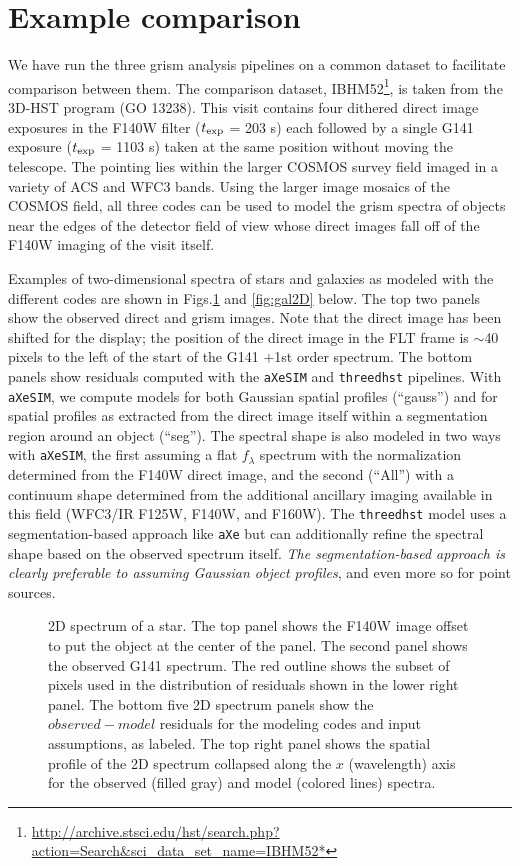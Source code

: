 \documentclass[preprint]{aastex}
\begin{document}
\section{Example comparison}

We have run the three grism analysis pipelines on a common dataset to facilitate comparison between them.  The comparison dataset, IBHM52\footnote{\url{http://archive.stsci.edu/hst/search.php?action=Search&sci_data_set_name=IBHM52*}}, is taken from the 3D-HST program (GO 13238).  This visit contains four dithered direct image exposures in the F140W filter ($t_{\rm exp}$ = 203 s) each followed by a single G141 exposure ($t_{\rm exp}$ = 1103 s) taken at the same position without moving the telescope.  The pointing lies within the larger COSMOS survey field imaged in a variety of ACS and WFC3 bands.  Using the larger image mosaics of the COSMOS field, all three codes can be used to model the grism spectra of objects near the edges of the detector field of view whose direct images fall off of the F140W imaging of the visit itself.
    
    Examples of two-dimensional spectra of stars and galaxies as modeled with the different codes are shown in Figs.\ref{fig:star2D} and \ref{fig:gal2D} below.  The top two panels show the observed direct and grism images.  Note that the direct image has been shifted for the display; the position of the direct image in the FLT frame is $\sim$40 pixels to the left of the start of the G141 +1st order spectrum.  The bottom panels show residuals computed with the \texttt{aXeSIM} and \texttt{threedhst} pipelines.  With \texttt{aXeSIM}, we compute models for both Gaussian spatial profiles (``gauss'') and for spatial profiles as extracted from the direct image itself within a segmentation region around an object (``seg'').  The spectral shape is also modeled in two ways with \texttt{aXeSIM}, the first assuming a flat $f_\lambda$ spectrum with the normalization determined from the F140W direct image, and the second (``All'') with a continuum shape determined from the additional ancillary imaging available in this field (WFC3/IR F125W, F140W, and F160W).  The \texttt{threedhst} model uses a segmentation-based approach like \texttt{aXe} but can additionally refine the spectral shape based on the observed spectrum itself.  \textit{The segmentation-based approach is clearly preferable to assuming Gaussian object profiles}, and even more so for point sources.  
    

\begin{figure}
    \caption{2D spectrum of a star.  The top panel shows the F140W image offset to put the object at the center of the panel.  The second panel shows the observed G141 spectrum.  The red outline shows the subset of pixels used in the distribution of residuals shown in the lower right panel.  The bottom five 2D spectrum panels show the $observed-model$ residuals for the modeling codes and input assumptions, as labeled.  The top right panel shows the spatial profile of the 2D spectrum collapsed along the $x$ (wavelength) axis for the observed (filled gray) and model (colored lines) spectra.}
    \label{fig:star2D}
\end{figure}
\end{document}
